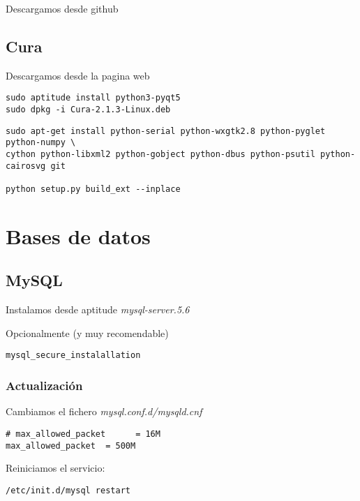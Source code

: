 \documentclass[12pt,spanish,]{article}
\begin{document}
Descargamos desde github

\subsection{Cura}\label{cura}

Descargamos desde la pagina web

\begin{verbatim}
sudo aptitude install python3-pyqt5
sudo dpkg -i Cura-2.1.3-Linux.deb
\end{verbatim}

\begin{verbatim}
sudo apt-get install python-serial python-wxgtk2.8 python-pyglet python-numpy \
cython python-libxml2 python-gobject python-dbus python-psutil python-cairosvg git

python setup.py build_ext --inplace
\end{verbatim}

\section{Bases de datos}\label{bases-de-datos}

\subsection{MySQL}\label{mysql}

Instalamos desde aptitude \emph{mysql-server.5.6}

Opcionalmente (y muy recomendable)

\begin{verbatim}
mysql_secure_instalallation
\end{verbatim}

\subsubsection{Actualización}\label{actualizaciuxf3n}

Cambiamos el fichero \emph{mysql.conf.d/mysqld.cnf}

\begin{verbatim}
# max_allowed_packet      = 16M
max_allowed_packet  = 500M
\end{verbatim}

Reiniciamos el servicio:

\begin{verbatim}
/etc/init.d/mysql restart
\end{verbatim}
\end{document}
